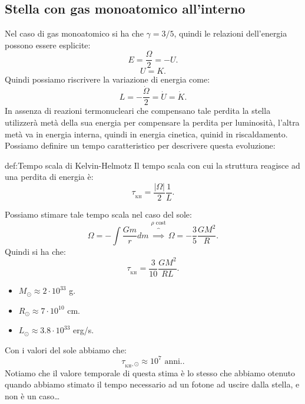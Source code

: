 \subsection{Stella con gas monoatomico all'interno}
\label{subsec:Stella con gas monoatomico all'interno}
Nel caso di gas monoatomico si ha che $\gamma= 3/5$, quindi le relazioni dell'energia possono essere esplicite:
\[
	E = \frac{\Omega}{2}=-U
.\] 
\[
	U=K 
.\] 
Quindi possiamo riscrivere la variazione di energia come:
\[
	L= -\frac{\dot{\Omega}}{2} = \dot{U}=\dot{K}
.\] 
In assenza di reazioni termonucleari che compensano tale perdita la stella utilizzerà metà della sua energia per compensare la perdita per luminosità, l'altra metà va in energia interna, quindi in energia cinetica, quinid in riscaldamento.\\
Possiamo definire un tempo caratteristico per descrivere questa evoluzione:
\begin{defn}{def:Tempo scala di Kelvin-Helmotz}
	Il tempo scala con cui la struttura reagisce ad una perdita di energia è:
	\[
		\tau_{_\text{KH}} = \frac{\left| \Omega \right| }{2} \frac{1}{L}
	.\] 
\end{defn}
Possiamo stimare tale tempo scala nel caso del sole:
\[
	\Omega  = - \int \frac{Gm}{r}d m  \overbrace{\implies}^{\rho \text{ cost}} \Omega  = - \frac{3}{5} \frac{GM^2}{R}
.\] 
Quindi si ha che:
\[
	\tau_{_\text{KH}} = \frac{3}{10} \frac{GM^2}{RL}
.\] 
\begin{itemize}
	\item $M_{\odot} \approx 2 \cdot 10^{33} $ g.
	\item $R_{\odot} \approx 7 \cdot 10^{10} $ cm.
	\item $L_{\odot} \approx 3.8 \cdot 10^{33}$ erg/s. 
\end{itemize}
Con i valori del sole abbiamo che:
\[
	\tau_{_\text{KH},\odot} \approx 10^{7} \text{ anni.}
.\] 
Notiamo che il valore temporale di questa stima è lo stesso che abbiamo otenuto quando abbiamo stimato il tempo necessario ad un fotone ad uscire dalla stella, e non è un caso\ldots
